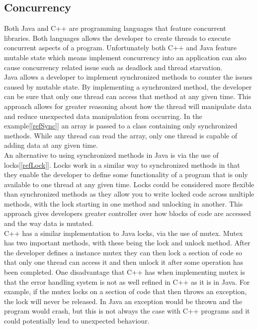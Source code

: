 \documentclass[10pt]{article}  %
\theoremstyle{definition}
\theoremstyle{remark}
\begin{document}
\subsection{Concurrency}\label{ss:back}

Both Java and C++ are programming languages that feature concurrent libraries. Both languages allows the developer to create threads to execute concurrent aspects of a program. Unfortunately both C++ and Java feature mutable state which means implement concurrency into an application can also cause concurrency related issue such as deadlock and thread starvation.\\

Java allows a developer to implement synchronized methods to counter the issues caused by mutable state. By implementing a synchronized method, the developer can be sure that only one thread can access that method at any given time. This approach allows for greater reasoning about how the thread will manipulate data and reduce unexpected data manipulation from occurring. In the example[\ref{refSync}] an array is passed to a class containing only synchronized methods. While any thread can read the array, only one thread is capable of adding data at any given time.\\

An alternative to using synchronized methods in Java is via the use of locks[\ref{refLock}]. Locks work in a similar way to synchronized methods in that they enable the developer to define some functionality of a program that is only available to one thread at any given time. Locks could be considered more flexible than synchronized methods as they allow you to write locked code across multiple methods, with the lock starting in one method and unlocking in another. This approach gives developers greater controller over how blocks of code are accessed and the way data is mutated.\\

C++ has a similar implementation to Java locks, via the use of mutex. Mutex has two important methods, with these being the lock and unlock method. After the developer defines a instance mutex they can then lock a section of code so that only one thread can access it and then unlock it after some operation has been completed. One disadvantage that C++ has when implementing mutex is that the error handling system is not as well refined in C++ as it is in Java. For example, if the mutex locks on a section of code that then throws an exception, the lock will never be released. In Java an exception would be thrown and the program would crash, but this is not always the case with C++ programs and it could potentially lead to unexpected behaviour.
\end{document}
